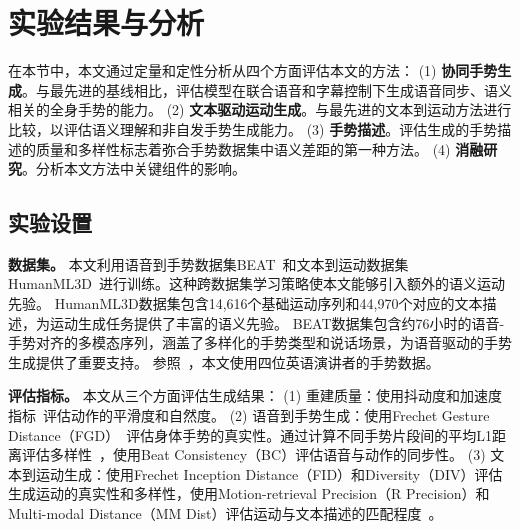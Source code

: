 

\section{实验结果与分析}
\label{sec:experiments}
在本节中，本文通过定量和定性分析从四个方面评估本文的方法：
(1) \textbf{协同手势生成}。与最先进的基线相比，评估模型在联合语音和字幕控制下生成语音同步、语义相关的全身手势的能力。
(2) \textbf{文本驱动运动生成}。与最先进的文本到运动方法进行比较，以评估语义理解和非自发手势生成能力。
(3) \textbf{手势描述}。评估生成的手势描述的质量和多样性标志着弥合手势数据集中语义差距的第一种方法。
(4) \textbf{消融研究}。分析本文方法中关键组件的影响。

\subsection{实验设置}
\textbf{数据集。}
本文利用语音到手势数据集BEAT~\cite{liu2022beat}和文本到运动数据集HumanML3D~\cite{guo2022humanml3d}进行训练。这种跨数据集学习策略使本文能够引入额外的语义运动先验。
HumanML3D数据集包含14,616个基础运动序列和44,970个对应的文本描述，为运动生成任务提供了丰富的语义先验。
BEAT数据集包含约76小时的语音-手势对齐的多模态序列，涵盖了多样化的手势类型和说话场景，为语音驱动的手势生成提供了重要支持。
参照~\cite{liu2022beat}，本文使用四位英语演讲者的手势数据。

\textbf{评估指标。}
本文从三个方面评估生成结果：
(1) 重建质量：使用抖动度和加速度指标~\cite{kucherenko2019analyzing}评估动作的平滑度和自然度。
(2) 语音到手势生成：使用Frechet Gesture Distance（FGD）~\cite{yoon2020speech}评估身体手势的真实性。通过计算不同手势片段间的平均L1距离评估多样性~\cite{liu2024emage}，使用Beat Consistency（BC）评估语音与动作的同步性。
(3) 文本到运动生成：使用Frechet Inception Distance（FID）和Diversity（DIV）评估生成运动的真实性和多样性，使用Motion-retrieval Precision（R Precision）和Multi-modal Distance（MM Dist）评估运动与文本描述的匹配程度~\cite{chen2023executing}。

